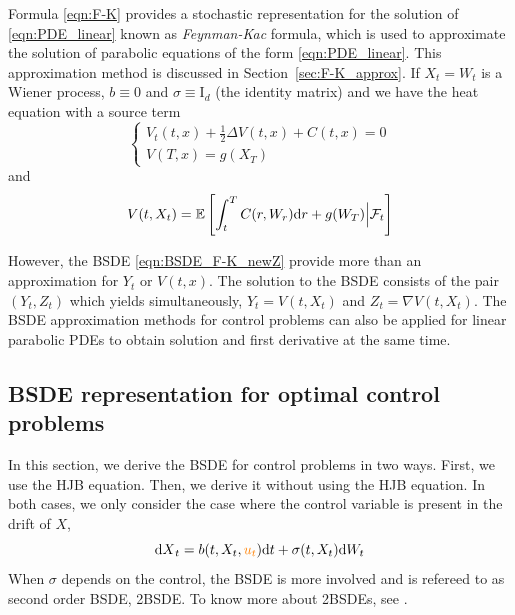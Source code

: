 \documentclass[11pt]{book}
\newcommand{\dt}{\text{\normalfont d}t}
\newcommand{\dr}{\text{\normalfont d}r}
\newcommand{\dX}{\text{\normalfont d}X}
\newcommand{\dW}{\text{\normalfont d}W}
\begin{document}
Formula \eqref{eqn:F-K} provides a stochastic representation for the solution of \eqref{eqn:PDE_linear} known as \emph{Feynman-Kac} formula, which is used to approximate the solution of parabolic equations of the form \eqref{eqn:PDE_linear}. This approximation method is discussed in Section~\ref{sec:F-K_approx}.
If $X_t=W_t$ is a Wiener process, $b\equiv0$ and $\sigma\equiv \text{I}_d$ (the identity matrix) and we have the heat equation with a source term
\[
\begin{cases}
    V_t(t,x)+\frac12\Delta V(t,x) + C(t,x) = 0\\
    V(T,x) = g(X_T)
\end{cases}
\]
and 
\[
V(t,X_t)=\mathbb{E}\left[\int_t^T C(r,W_r){{\dr}}+g(W_T)\Big|\mathcal{F}_t\right]
\]

However, the BSDE \eqref{eqn:BSDE_F-K_newZ} provide more than an approximation for $Y_t$ or $V(t,x)$. The solution to the BSDE consists of the pair $(Y_t,Z_t)$ which yields simultaneously, 
$Y_t = V(t,X_t)$ and $Z_t= \nabla V(t,X_t)$. The BSDE approximation methods for control problems can also be applied for linear parabolic PDEs to obtain solution and first derivative at the same time.

\subsection{BSDE representation for optimal control problems}
\label{sec:BSDE_approx}
In this section, we derive the BSDE for control problems in two ways. First, we use the HJB equation. Then, we derive it without using the HJB equation. 
In both cases, we only consider the case where the control variable is present in the drift of $X$, 
\[
{\dX}_t =b(t,X_t,{\color{orange}u_t}){\dt}+\sigma(t,X_t)\dW_t
\]
When $\sigma$ depends on the control, the BSDE is more involved and is refereed to as second order BSDE, 2BSDE. To know more about 2BSDEs, see \citet{CSTV07,STZ12}.
\end{document}
